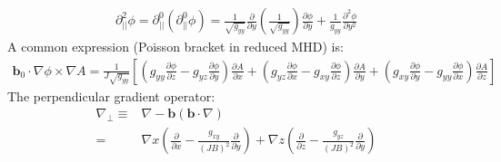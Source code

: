\documentclass[12pt]{article}
\newcommand{\deriv}[2]{\ensuremath{\frac{\partial #1}{\partial #2}}}
\newcommand{\ve}[1]{\ensuremath{\boldsymbol{#1}}}
\newcommand{\bvec}{\ve{b}}
\begin{document}
%
\begin{align*}
\partial^2_{||}\phi = \partial^0_{||}\left(\partial^0_{||}\phi\right) =
\frac{1}{\sqrt{g_{yy}}}\deriv{}{y}\left(\frac{1}{\sqrt{g_{yy}}}\right)\deriv{
\phi}{y} + \frac{1}{g_{yy}}\frac{\partial^2\phi}{\partial y^2}
\end{align*}
%
A common expression (Poisson bracket in reduced MHD) is:
%
\begin{align*}
\bvec_0\cdot\nabla\phi\times\nabla A =
\frac{1}{J\sqrt{g_{yy}}}\left[\left(g_{yy}\deriv{\phi}{z} -
    g_{yz}\deriv{\phi}{y}\right)\deriv{A}{x} + \left(g_{yz}\deriv{\phi}{x} -
    g_{xy}\deriv{\phi}{z}\right)\deriv{A}{y} + \left(g_{xy}\deriv{\phi}{y} -
g_{yy}\deriv{\phi}{x}\right)\deriv{A}{z}\right]
\end{align*}
%
The perpendicular gradient operator:
%
\begin{align*}
\nabla_\perp \equiv& \nabla - \ve{b}\left(\ve{b}\cdot\nabla\right) \\ =& \nabla
    x\left(\deriv{}{x} - \frac{g_{xy}}{\left(JB\right)^2}\deriv{}{y}\right) +
    \nabla z\left(\deriv{}{z} -
    \frac{g_{yz}}{\left(JB\right)^2}\deriv{}{y}\right)
\end{align*}
%
\end{document}
